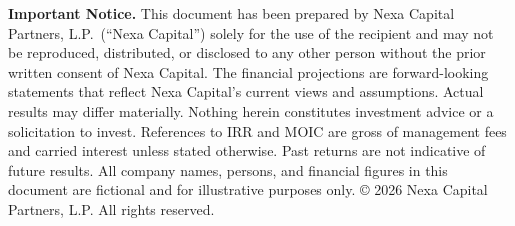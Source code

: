 \vspace{14pt}

\begin{tcolorbox}[
  enhanced, sharp corners,
  colback=IceBlue, colframe=LightRule,
  boxrule=0.5pt,
  left=8pt, right=8pt, top=5pt, bottom=5pt,
  fontupper=\scriptsize\color{SlateGrey}
]
  \textbf{Important Notice.} This document has been prepared by Nexa Capital Partners, L.P.\
  (``Nexa Capital'') solely for the use of the recipient and may not be reproduced, distributed, or
  disclosed to any other person without the prior written consent of Nexa Capital. The financial
  projections are forward-looking statements that reflect Nexa Capital's current views and
  assumptions. Actual results may differ materially. Nothing herein constitutes investment advice
  or a solicitation to invest. References to IRR and MOIC are gross of management fees and carried
  interest unless stated otherwise. Past returns are not indicative of future results.
  All company names, persons, and financial figures in this document are fictional and for
  illustrative purposes only. \copyright{} 2026 Nexa Capital Partners, L.P. All rights reserved.
\end{tcolorbox}
